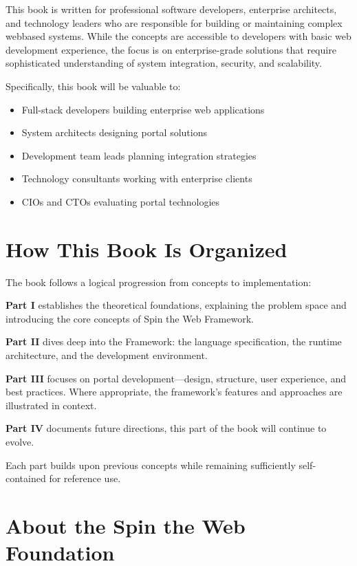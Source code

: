 This book is written for professional software developers, enterprise architects, and technology leaders who are responsible for building or maintaining complex webbased systems. While the concepts are accessible to developers with basic web development experience, the focus is on enterprise-grade solutions that require sophisticated understanding of system integration, security, and scalability.

Specifically, this book will be valuable to:
\begin{itemize}
\item Full-stack developers building enterprise web applications
\item System architects designing portal solutions
\item Development team leads planning integration strategies
\item Technology consultants working with enterprise clients
\item CIOs and CTOs evaluating portal technologies
\end{itemize}

\section*{How This Book Is Organized}

The book follows a logical progression from concepts to implementation:

\textbf{Part I} establishes the theoretical foundations, explaining the problem space and introducing the core concepts of Spin the Web Framework.

\textbf{Part II} dives deep into the Framework: the \wbdl language specification, the \webspinner runtime architecture, and the \studio development environment.

\textbf{Part III} focuses on portal development—design, structure, user experience, and best practices. Where appropriate, the framework’s features and approaches are illustrated in context.

\textbf{Part IV} documents future directions, this part of the book will continue to evolve.

Each part builds upon previous concepts while remaining sufficiently self-contained for reference use.

\section*{About the Spin the Web Foundation}

